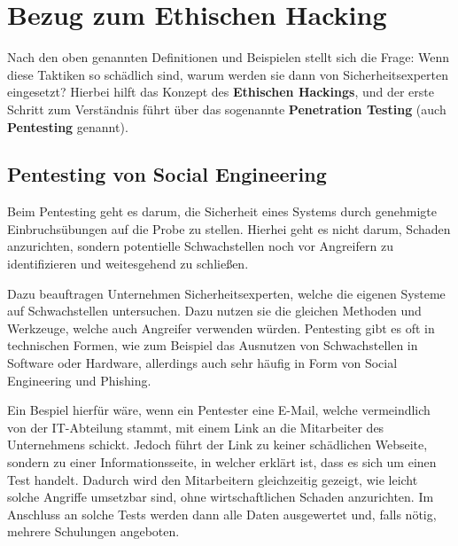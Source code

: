 \documentclass[12pt, a4paper, oneside]{scrartcl}
\begin{document}
\section{Bezug zum Ethischen Hacking}
Nach den oben genannten Definitionen und Beispielen stellt sich die Frage: Wenn diese Taktiken
so schädlich sind, warum werden sie dann von Sicherheitsexperten eingesetzt? Hierbei hilft das Konzept
des \textbf{Ethischen Hackings}, und der erste Schritt zum Verständnis führt über das sogenannte
\textbf{Penetration Testing} (auch \textbf{Pentesting} genannt).

\subsection{Pentesting von Social Engineering}
Beim Pentesting geht es darum, die Sicherheit eines Systems durch genehmigte Einbruchsübungen auf die 
Probe zu stellen. Hierhei geht es nicht darum, Schaden anzurichten, sondern potentielle Schwachstellen
noch vor Angreifern zu identifizieren und weitesgehend zu schließen.
\par
Dazu beauftragen Unternehmen Sicherheitsexperten, welche die eigenen Systeme auf Schwachstellen untersuchen.
Dazu nutzen sie die gleichen Methoden und Werkzeuge, welche auch Angreifer verwenden würden. Pentesting gibt
es oft in technischen Formen, wie zum Beispiel das Ausnutzen von Schwachstellen in Software oder Hardware,
allerdings auch sehr häufig in Form von Social Engineering und Phishing.
\par
Ein Bespiel hierfür wäre, wenn ein Pentester eine E-Mail, welche vermeindlich von der IT-Abteilung stammt,
mit einem Link an die Mitarbeiter des Unternehmens schickt. Jedoch führt der Link zu keiner schädlichen Webseite, sondern
zu einer Informationsseite, in welcher erklärt ist, dass es sich um einen Test handelt. Dadurch wird 
den Mitarbeitern gleichzeitig gezeigt, wie leicht solche Angriffe umsetzbar sind, ohne wirtschaftlichen Schaden
anzurichten. Im Anschluss an solche Tests werden dann alle Daten ausgewertet und, falls nötig, mehrere Schulungen angeboten.
\end{document}
